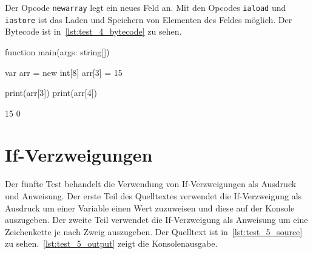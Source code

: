 Der Opcode \texttt{newarray} legt ein neues Feld an. Mit den Opcodes \texttt{iaload} und \texttt{iastore} ist das Laden und Speichern von Elementen des Feldes möglich. Der Bytecode ist in~\autoref{lst:test_4_bytecode} zu sehen.

\begin{ToyaCode}[numbers=none, caption={Felder},label=lst:test_4_source]
function main(args: string[]) {
    var arr = new int[8]
    arr[3] = 15

    print(arr[3])
    print(arr[4])
}
\end{ToyaCode}


\begin{ToyaCode}[numbers=none, caption={Konsolen-Ausgabe der Felder},label=lst:test_4_output]
15
0    
\end{ToyaCode}

\section{If-Verzweigungen}

Der fünfte Test behandelt die Verwendung von If-Verzweigungen als Ausdruck und Anweisung. Der erste Teil des Quelltextes verwendet die If-Verzweigung als Ausdruck um einer Variable einen Wert zuzuweisen und diese auf der Konsole auszugeben. Der zweite Teil verwendet die If-Verzweigung als Anweisung um eine Zeichenkette je nach Zweig auszugeben. Der Quelltext ist in~\autoref{lst:test_5_source} zu sehen.~\autoref{lst:test_5_output} zeigt die Konsolenausgabe.

